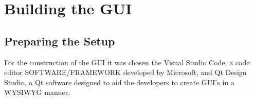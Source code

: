 

\chapter{Building the GUI}
\label{cha:users_manual}

\glsresetall

\section{Preparing the Setup} %
\label{sec:setup_prep}

For the construction of the GUI it was chosen the Visual Studio Code, a code editor SOFTWARE/FRAMEWORK developed by Microsoft, and Qt Design Studio, a Qt software designed to aid the developers to create GUI's in a WYSIWYG manner.\\








